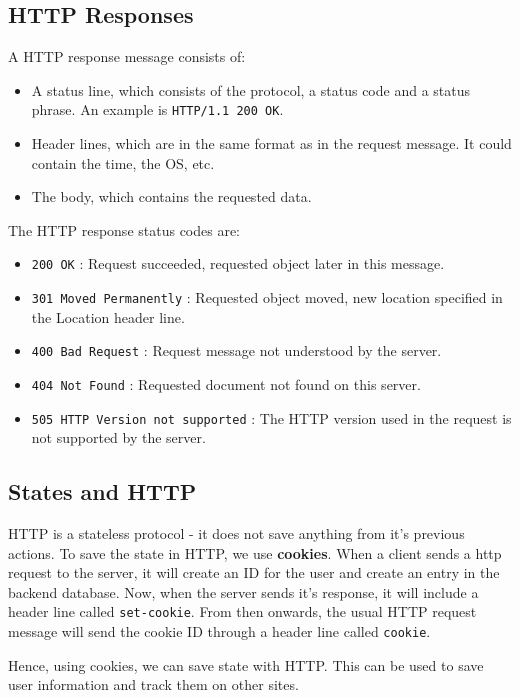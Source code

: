 \documentclass[12pt,letterpaper]{amsbook}
\theoremstyle{definition}
\begin{document}
\subsection{HTTP Responses}

A HTTP response message consists of:

\begin{itemize}
  \item A status line, which consists of the protocol, a status code and a status phrase. An example is \texttt{HTTP/1.1 200 OK}.
  \item Header lines, which are in the same format as in the request message. It could contain the time, the OS, etc.
  \item The body, which contains the requested data.
\end{itemize}

The HTTP response status codes are:

\begin{itemize}
  \item \texttt{200 OK} : Request succeeded, requested object later in this message.
  \item \texttt{301 Moved Permanently} : Requested object moved, new location specified in the Location header line.
  \item \texttt{400 Bad Request} : Request message not understood by the server.
  \item \texttt{404 Not Found} : Requested document not found on this server.
  \item \texttt{505 HTTP Version not supported} : The HTTP version used in the request is not supported by the server.
\end{itemize}

\subsection{States and HTTP}

HTTP is a stateless protocol - it does not save anything from it's previous actions. To save the state in HTTP, we use \textbf{cookies}. When a client sends a http request to the server, it will create an ID for the user and create an entry in the backend database. Now, when the server sends it's response, it will include a header line called \texttt{set-cookie}. From then onwards, the usual HTTP request message will send the cookie ID through a header line called \texttt{cookie}.

Hence, using cookies, we can save state with HTTP. This can be used to save user information and track them on other sites.
\end{document}
